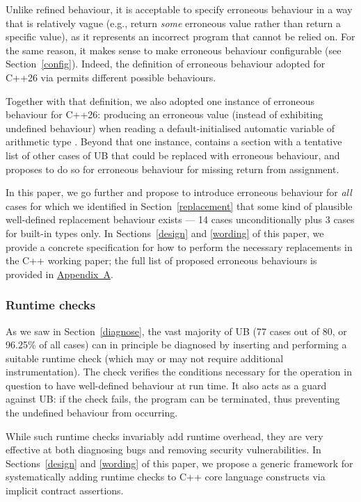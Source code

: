 {Unlike refined behaviour, it is acceptable to specify erroneous behaviour in a way that is relatively vague (e.g., return \emph{some} erroneous value rather than return a specific value), as it represents an incorrect program that cannot be relied on. For the same reason, it makes sense to make erroneous behaviour configurable (see Section~\ref{config}). Indeed, the definition of erroneous behaviour adopted for C++26 via \cite{P2795R5} permits different possible behaviours.

Together with that definition, we also adopted one instance of erroneous behaviour for C++26: producing an erroneous value (instead of exhibiting undefined behaviour) when reading a default-initialised automatic variable of arithmetic type \cite{P2795R5}. Beyond that one instance, \cite{P2795R5} contains a section with a tentative list of other cases of UB that could be replaced with erroneous behaviour, and \cite{P2973R0} proposes to do so for erroneous behaviour for missing return from assignment.

In this paper, we go further and propose to introduce erroneous behaviour for \emph{all} cases for which we identified in Section~\ref{replacement} that some kind of plausible well-defined replacement behaviour exists --- 14 cases unconditionally plus 3 cases for built-in types only. In Sections~\ref{design} and \ref{wording} of this paper, we provide a concrete specification for how to perform the necessary replacements in the C++ working paper; the full list of proposed erroneous behaviours is provided in \hyperref[appendix]{Appendix~A}.

\subsubsection{Runtime checks}
\label{checks}

As we saw in Section~\ref{diagnose}, the vast majority of UB (77 cases out of 80, or 96.25\% of all cases) can in principle be diagnosed by inserting and performing a suitable runtime check (which may or may not require additional instrumentation). The check verifies the conditions necessary for the operation in question to have well-defined behaviour at run time. It also acts as a guard against UB: if the check fails, the program can be terminated, thus preventing the undefined behaviour from occurring.

While such runtime checks invariably add runtime overhead, they are very effective at both diagnosing bugs and removing security vulnerabilities. In Sections~\ref{design} and \ref{wording} of this paper, we propose a generic framework for systematically adding runtime checks to C++ core language constructs via implicit contract assertions.

}
